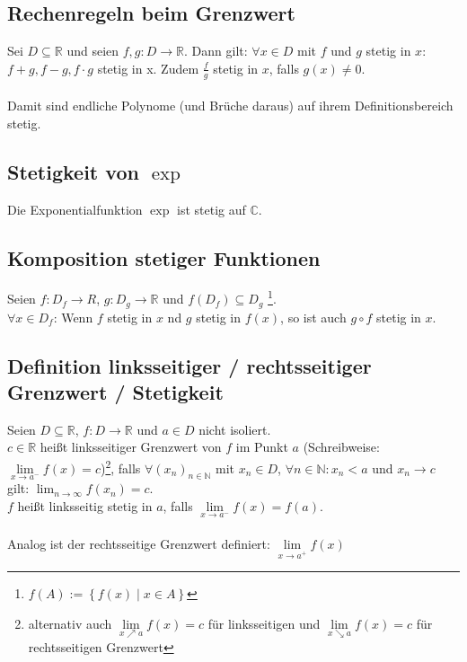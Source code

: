 \documentclass[halfparscip]{scrartcl}
\newcounter{subsection2}
\begin{document}
\subsection{Rechenregeln beim Grenzwert}
Sei $D \subseteq \mathbb{R}$ und seien $f, g: D \rightarrow \mathbb{R}$. Dann gilt:
$\forall x \in D$ mit $f$ und $g$ stetig in $x$: $f + g, f-g, f\cdot g$ stetig in x. Zudem $\frac{f}{g}$ stetig in $x$, falls $g(x) \neq 0$.\\\\
Damit sind endliche Polynome (und Brüche daraus) auf ihrem Definitionsbereich stetig.

\subsection{Stetigkeit von $\exp$}
Die Exponentialfunktion $\exp$ ist stetig auf $\mathbb{C}$.

\subsection{Komposition stetiger Funktionen}
Seien $f: D_f \rightarrow R$, $g : D_g \rightarrow \mathbb{R}$ und $f(D_f) \subseteq D_g$ \footnote{$f(A) := \left\{f(x) \;\vert\; x \in A\right\}$}.\\
$\forall x \in D_f$: Wenn $f$ stetig in $x$ nd $g$ stetig in $f(x)$, so ist auch $g \circ f$ stetig in $x$.

\subsection{Definition linksseitiger / rechtsseitiger Grenzwert / Stetigkeit}
Seien $D \subseteq \mathbb{R}$, $f : D \rightarrow \mathbb{R}$ und $a \in D$ nicht isoliert.\\
$c \in \mathbb{R}$ heißt linksseitiger Grenzwert von $f$ im Punkt $a$ (Schreibweise: $\lim\limits_{x \rightarrow a^-} f(x) = c$)\footnote{alternativ auch $\lim\limits_{x \nearrow a} f(x) = c$ für linksseitigen und $\lim\limits_{x \searrow a} f(x) = c$ für rechtsseitigen Grenzwert}, falls $\forall (x_n)_{n \in \mathbb{N}}$ mit $x_n \in D$, $\forall n \in \mathbb{N}: x_n < a$ und $x_n \rightarrow c$ gilt: $\lim_{n \rightarrow \infty} f(x_n) = c$.\\
$f$ heißt linksseitig stetig in $a$, falls $\lim\limits_{x \rightarrow a^-} f(x) = f(a)$.\\\\
Analog ist der rechtsseitige Grenzwert definiert: $\lim\limits_{x \rightarrow a^+} f(x)$
\end{document}
